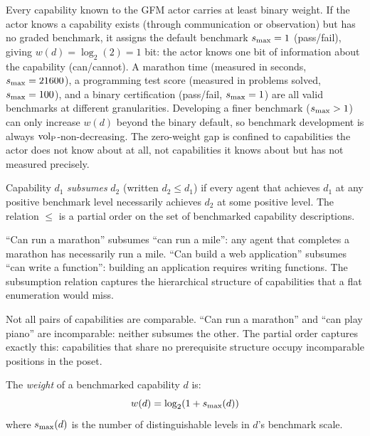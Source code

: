 Every capability known to the GFM actor carries at least binary weight. If the
actor knows a capability exists (through communication or observation) but has
no graded benchmark, it assigns the default benchmark $s_{\mathrm{max}} = 1$ (pass/fail),
giving $w(d) = \log_2(2) = 1$ bit: the actor knows one bit of information
about the capability (can/cannot). A marathon time (measured in seconds, $s_{\mathrm{max}}
= 21600$), a programming test score (measured in problems solved, $s_{\mathrm{max}} =
100$), and a binary certification (pass/fail, $s_{\mathrm{max}} = 1$) are all valid
benchmarks at different granularities. Developing a finer benchmark ($s_{\mathrm{max}} >
1$) can only increase $w(d)$ beyond the binary default, so benchmark
development is always ${\operatorname{vol}_{\mathrm{P}}}$-non-decreasing. The zero-weight gap is confined
to capabilities the actor does not know about at all, not capabilities it knows
about but has not measured precisely.


\begin{definition}[Subsumption]
\label{def:subsumption}
Capability $d_1$ \emph{subsumes} $d_2$ (written $d_2 \leq d_1$) if every
    agent that achieves $d_1$ at any positive benchmark level necessarily
    achieves $d_2$ at some positive level. The relation $\leq$ is a partial
    order on the set of benchmarked capability descriptions.
\end{definition}

``Can run a marathon'' subsumes ``can run a mile'': any agent that completes a
marathon has necessarily run a mile. ``Can build a web application'' subsumes
``can write a function'': building an application requires writing functions.
The subsumption relation captures the hierarchical structure of capabilities
that a flat enumeration would miss.

Not all pairs of capabilities are comparable. ``Can run a marathon'' and ``can
play piano'' are incomparable: neither subsumes the other. The partial order
captures exactly this: capabilities that share no prerequisite structure occupy
incomparable positions in the poset.


\begin{definition}
\label{def:weight}
The \emph{weight} of a benchmarked capability $d$ is:
\begin{equation}
\label{eq:weight}
w(d) = \log_2(1 + s_{\mathrm{max}}(d))
\end{equation}
where $s_{\mathrm{max}}(d)$ is the number of distinguishable levels in $d$'s benchmark
    scale.
\end{definition}

